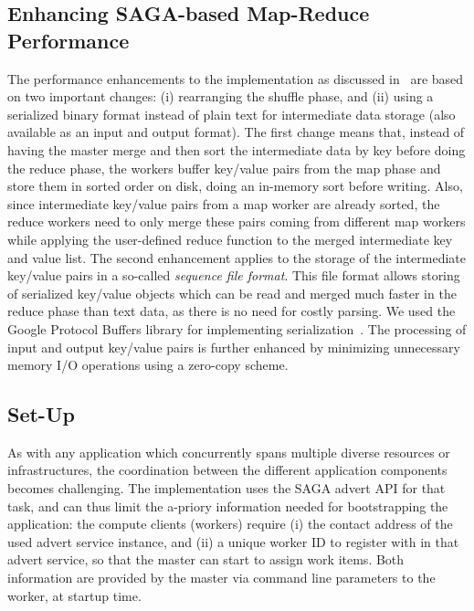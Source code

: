 \documentclass[3p,twocolumn]{elsarticle}
\begin{document}
\subsection{Enhancing SAGA-based Map-Reduce Performance}

The performance enhancements to the \sagamapreduce implementation as
discussed in~\cite{saga_ccgrid09} are based on two important changes:
(i) rearranging the shuffle phase, and (ii) using a serialized binary
format instead of plain text for intermediate data storage (also
available as an input and output format).  The first change means
that, instead of having the master merge and then sort the
intermediate data by key before doing the reduce phase, the workers
buffer key/value pairs from the map phase and store them in sorted
order on disk, doing an in-memory sort before writing. Also, since
intermediate key/value pairs from a map worker are already sorted, the
reduce workers need to only merge these pairs coming from different
map workers while applying the user-defined reduce function to the
merged intermediate key and value list.  The second enhancement
applies to the storage of the intermediate key/value pairs in a
so-called \emph{sequence file format}. This file format allows storing
of serialized key/value objects which can be read and merged much
faster in the reduce phase than text data, as there is no need for
costly parsing.  We used the Google Protocol Buffers library for
implementing serialization~\cite{protobuf}.  The processing of input
and output key/value pairs is further enhanced by minimizing
unnecessary memory I/O operations using a zero-copy scheme.


\subsection{\sagamapreduce Set-Up}

As with any application which concurrently spans multiple diverse
resources or infrastructures, the coordination between the different
application components becomes challenging.  The \smr implementation
uses the SAGA advert API for that task, and can thus limit the a-priory
information needed for bootstrapping the application: the compute
clients (workers) require (i) the contact address of the used advert
service instance, and (ii) a unique worker ID to register with in that
advert service, so that the master can start to assign work items.
Both information are provided by the master via command line
parameters to the worker, at startup time.
\end{document}
